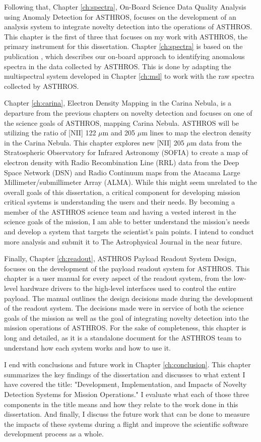 Following that, Chapter \ref{ch:spectra}, On-Board Science Data Quality Analysis using Anomaly Detection for ASTHROS, focuses on the development of an analysis system to integrate novelty detection into the operations of ASTHROS.
This chapter is the first of three that focuses on my work with ASTHROS, the primary instrument for this dissertation.
Chapter \ref{ch:spectra} is based on the publication \cite{horton2024board}, which describes our on-board approach to identifying anomalous spectra in the data collected by ASTHROS.
This is done by adapting the multispectral system developed in Chapter \ref{ch:msl} to work with the raw spectra collected by ASTHROS.

Chapter \ref{ch:carina}, Electron Density Mapping in the Carina Nebula, is a departure from the previous chapters on novelty detection and focuses on one of the science goals of ASTHROS, mapping Carina Nebula.
ASTHROS will be utilizing the ratio of [NII] 122 $\mu$m and 205 $\mu$m lines to map the electron density in the Carina Nebula.
This chapter explores new [NII] 205 $\mu$m data from the Stratospheric Observatory for Infrared Astronomy (SOFIA) to create a map of electron density with Radio Recombination Line (RRL) data from the Deep Space Network (DSN) and Radio Continuum maps from the Atacama Large Millimeter/submillimeter Array (ALMA).
While this might seem unrelated to the overall goals of this dissertation, a critical component for developing mission critical systems is understanding the users and their needs.
By becoming a member of the ASTHROS science team and having a vested interest in the science goals of the mission, I am able to better understand the mission's needs and develop a system that targets the scientist's pain points.
I intend to conduct more analysis and submit it to The Astrophysical Journal in the near future.

Finally, Chapter \ref{ch:readout}, ASTHROS Payload Readout System Design, focuses on the development of the payload readout system for ASTHROS.
This chapter is a user manual for every aspect of the readout system, from the low-level hardware drivers to the high-level interfaces used to control the entire payload.
The manual outlines the design decisions made during the development of the readout system.
The decisions made were in service of both the science goals of the mission as well as the goal of integrating novelty detection into the mission operations of ASTHROS.
For the sake of completeness, this chapter is long and detailed, as it is a standalone document for the ASTHROS team to understand how each system works and how to use it.

I end with conclusions and future work in Chapter \ref{ch:conclusion}.
This chapter summarizes the key findings of the dissertation and discusses to what extent I have covered the title: "Development, Implementation, and Impacts of Novelty Detection Systems for Mission Operations."
I evaluate what each of those three components in the title means and how they relate to the work done in this dissertation.
And finally, I discuss the future work that can be done to measure the impacts of these systems during a flight and improve the scientific software development process as a whole.